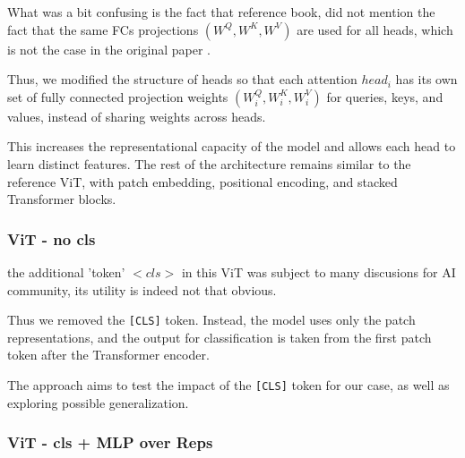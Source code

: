 \documentclass[twocolumn,superscriptaddress,aps]{revtex4-1}
\begin{document}
What was a bit confusing is the fact that reference book, did not mention the fact that the same FCs projections $(W^Q, W^K, W^V)$ are used for all heads, which is not the case in the original paper \cite{dosovitskiy2020image}.

Thus, we modified the structure of heads so that each attention $head_i$ has its own set of fully connected projection weights $(W^Q_i, W^K_i, W^V_i)$ for queries, keys, and values, instead of sharing weights across heads.

This increases the representational capacity of the model and allows each head to learn distinct features. The rest of the architecture remains similar to the reference ViT, with patch embedding, positional encoding, and stacked Transformer blocks.


\subsubsection{ViT - no cls}
the additional 'token' $<cls>$ in this ViT was subject to many discusions for AI community, its utility is indeed not that obvious.

Thus we removed the \texttt{[CLS]} token. Instead, the model uses only the patch representations, and the output for classification is taken from the first patch token after the Transformer encoder.

The approach aims to test the impact of the \texttt{[CLS]} token for our case, as well as exploring possible generalization.


\subsubsection{ViT - cls + MLP over Reps}
\end{document}
